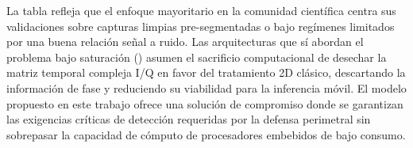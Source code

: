 La tabla refleja que el enfoque mayoritario en la comunidad científica centra sus validaciones sobre capturas limpias pre-segmentadas o bajo regímenes limitados por una buena relación señal a ruido. Las arquitecturas que sí abordan el problema bajo saturación (\cite{gluge_robust_2024}) asumen el sacrificio computacional de desechar la matriz temporal compleja I/Q en favor del tratamiento 2D clásico, descartando la información de fase y reduciendo su viabilidad para la inferencia móvil. El modelo propuesto en este trabajo ofrece una solución de compromiso donde se garantizan las exigencias críticas de detección requeridas por la defensa perimetral sin sobrepasar la capacidad de cómputo de procesadores embebidos de bajo consumo.
